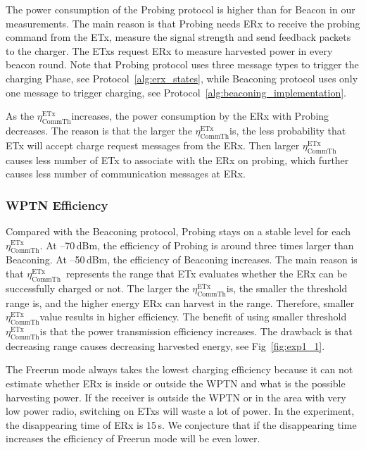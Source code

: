 \documentclass[11pt,draftclsnofoot,journal,onecolumn]{IEEEtran}
\newcommand{\txRssiThreshold}{$\eta^\text{ETx}_\text{CommTh}$}
\begin{document}
The power consumption of the Probing protocol is higher than for Beacon in our measurements. The main reason is that Probing needs ERx to receive the probing command from the ETx, measure the signal strength and send feedback packets to the charger. The ETxs request ERx to measure harvested power in every beacon round. Note that Probing protocol uses three message types to trigger the charging Phase, see Protocol~\ref{alg:erx_states}, while Beaconing protocol uses only one message to trigger charging, see Protocol~\ref{alg:beaconing_implementation}.

As the \txRssiThreshold increases, the power consumption by the ERx with Probing decreases. The reason is that the larger the \txRssiThreshold is, the less probability that ETx will accept charge request messages from the ERx. Then larger \txRssiThreshold causes less number of ETx to associate with the ERx on probing, which further causes less number of communication messages at ERx.

\subsubsection{WPTN Efficiency}

Compared with the Beaconing protocol, Probing stays on a stable level for each \txRssiThreshold. At --70\,dBm, the efficiency of Probing is around three times larger than Beaconing. At --50\,dBm, the efficiency of Beaconing increases. The main reason is that \txRssiThreshold~represents the range that ETx evaluates whether the ERx can be successfully charged or not. The larger the \txRssiThreshold is, the smaller the threshold range is, and the higher energy ERx can harvest in the range. Therefore, smaller \txRssiThreshold value results in higher efficiency. The benefit of using smaller threshold \txRssiThreshold is that the power transmission efficiency increases. The drawback is that decreasing range causes decreasing harvested energy, see Fig~\ref{fig:exp1_1}.

The Freerun mode always takes the lowest charging efficiency because it can not estimate whether ERx is inside or outside the WPTN and what is the possible harvesting power. If the receiver is outside the WPTN or in the area with very low power radio, switching on ETxs will waste a lot of power. In the experiment, the disappearing time of ERx is 15\,s. We conjecture that if the disappearing time increases the efficiency of Freerun mode will be even lower.
\end{document}
